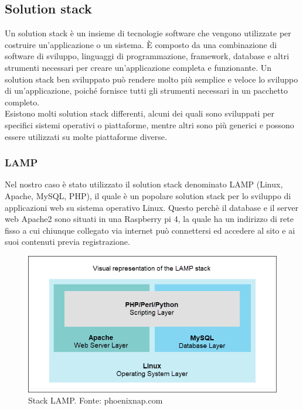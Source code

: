 \documentclass[a4paper,final,12pt]{report}
\begin{document}
\subsection{Solution stack}
Un solution stack è un insieme di tecnologie software che vengono utilizzate per costruire un'applicazione o un sistema. È composto da una combinazione di software di sviluppo, linguaggi di programmazione, framework, database e altri strumenti necessari per creare un'applicazione completa e funzionante.
Un solution stack ben sviluppato può rendere molto più semplice e veloce lo sviluppo di un'applicazione, poiché fornisce tutti gli strumenti necessari in un pacchetto completo.\\ 
Esistono molti solution stack differenti, alcuni dei quali sono sviluppati per specifici sistemi operativi o piattaforme, mentre altri sono più generici e possono essere utilizzati su molte piattaforme diverse.\\

\subsubsection{LAMP}
Nel nostro caso è stato utilizzato il solution stack denominato LAMP (Linux, Apache, MySQL, PHP), il quale è un popolare solution stack per lo sviluppo di applicazioni web su sistema operativo Linux. Questo perchè il database e il server web Apache2 sono situati in una Raspberry pi 4, la quale ha un indirizzo di rete fisso a cui chiunque collegato via internet può connettersi ed accedere al sito e ai suoi contenuti previa registrazione.
\begin{figure}[hbtp]
\centering
\includegraphics[scale=0.47]{img_concettuale/LAMP.png}
\caption{Stack LAMP. Fonte: phoenixnap.com}
\end{figure} 
\end{document}
